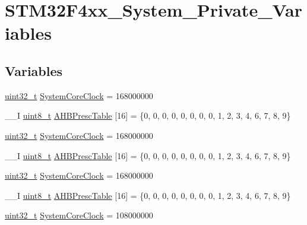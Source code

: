 \hypertarget{group___s_t_m32_f4xx___system___private___variables}{\section{S\-T\-M32\-F4xx\-\_\-\-System\-\_\-\-Private\-\_\-\-Variables}
\label{group___s_t_m32_f4xx___system___private___variables}
}
\subsection*{Variables}
\begin{DoxyCompactItemize}
\item 
\hyperlink{stdint_8h_a435d1572bf3f880d55459d9805097f62}{uint32\-\_\-t} \hyperlink{group___s_t_m32_f4xx___system___private___variables_gaa3cd3e43291e81e795d642b79b6088e6}{System\-Core\-Clock} = 168000000
\item 
\-\_\-\-\_\-\-I \hyperlink{stdint_8h_aba7bc1797add20fe3efdf37ced1182c5}{uint8\-\_\-t} \hyperlink{group___s_t_m32_f4xx___system___private___variables_gacdc3ef54c0704c90e69a8a84fb2d970d}{A\-H\-B\-Presc\-Table} \mbox{[}16\mbox{]} = \{0, 0, 0, 0, 0, 0, 0, 0, 1, 2, 3, 4, 6, 7, 8, 9\}
\item 
\hyperlink{stdint_8h_a435d1572bf3f880d55459d9805097f62}{uint32\-\_\-t} \hyperlink{group___s_t_m32_f4xx___system___private___variables_gaa3cd3e43291e81e795d642b79b6088e6}{System\-Core\-Clock} = 168000000
\item 
\-\_\-\-\_\-\-I \hyperlink{stdint_8h_aba7bc1797add20fe3efdf37ced1182c5}{uint8\-\_\-t} \hyperlink{group___s_t_m32_f4xx___system___private___variables_gacdc3ef54c0704c90e69a8a84fb2d970d}{A\-H\-B\-Presc\-Table} \mbox{[}16\mbox{]} = \{0, 0, 0, 0, 0, 0, 0, 0, 1, 2, 3, 4, 6, 7, 8, 9\}
\item 
\hyperlink{stdint_8h_a435d1572bf3f880d55459d9805097f62}{uint32\-\_\-t} \hyperlink{group___s_t_m32_f4xx___system___private___variables_gaa3cd3e43291e81e795d642b79b6088e6}{System\-Core\-Clock} = 168000000
\item 
\-\_\-\-\_\-\-I \hyperlink{stdint_8h_aba7bc1797add20fe3efdf37ced1182c5}{uint8\-\_\-t} \hyperlink{group___s_t_m32_f4xx___system___private___variables_gacdc3ef54c0704c90e69a8a84fb2d970d}{A\-H\-B\-Presc\-Table} \mbox{[}16\mbox{]} = \{0, 0, 0, 0, 0, 0, 0, 0, 1, 2, 3, 4, 6, 7, 8, 9\}
\item 
\hyperlink{stdint_8h_a435d1572bf3f880d55459d9805097f62}{uint32\-\_\-t} \hyperlink{group___s_t_m32_f4xx___system___private___variables_gaa3cd3e43291e81e795d642b79b6088e6}{System\-Core\-Clock} = 108000000

\end{DoxyCompactItemize}
